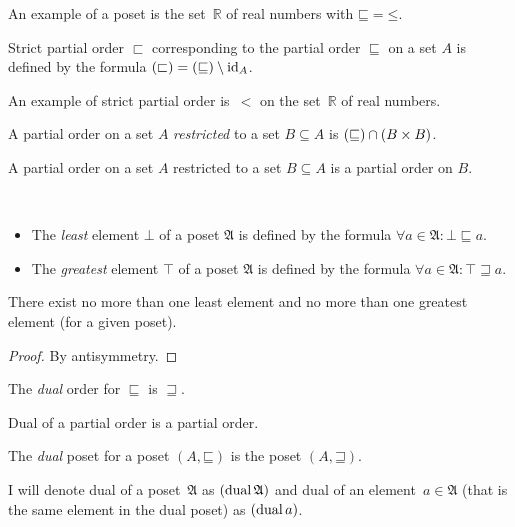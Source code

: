 An example of a poset is the set~$\mathbb{R}$ of real numbers with $\mathord{\sqsubseteq} = \mathord{\leq}$.

\begin{defn}
Strict partial order $\sqsubset$ corresponding
to the partial order $\sqsubseteq$ on a set $A$ is defined by the
formula $\left(\mathord{\sqsubset}\right)=\left(\mathord{\sqsubseteq}\right)\setminus\operatorname{id}_{A}$.
\end{defn}

An example of strict partial order is~$<$ on the set~$\mathbb{R}$ of real numbers.

\begin{defn}
A partial order on a set $A$ \emph{restricted}
to a set $B\subseteq A$ is $\left(\mathord{\sqsubseteq}\right)\cap(B\times B)$.\end{defn}
\begin{obvious}
A partial order on a set $A$ restricted to a set $B\subseteq A$
is a partial order on $B$.\end{obvious}
\begin{defn}
~
\begin{itemize}
\item {}The \emph{least} element $\bot$ of a poset
$\mathfrak{A}$ is defined by the formula $\forall a\in\mathfrak{A}:\bot\sqsubseteq a$.
\item {}The \emph{greatest} element $\top$ of a
poset $\mathfrak{A}$ is defined by the formula $\forall a\in\mathfrak{A}:\top\sqsupseteq a$.
\end{itemize}
\end{defn}
\begin{prop}
There exist no more than one least element and no more than one greatest
element (for a given poset).\end{prop}
\begin{proof}
By antisymmetry.\end{proof}
\begin{defn}
The \emph{dual} order for $\sqsubseteq$ is $\sqsupseteq$.\end{defn}
\begin{obvious}
Dual of a partial order is a partial order.\end{obvious}
\begin{defn}
The \emph{dual} poset for a poset $(A,\mathord{\sqsubseteq})$
is the poset $(A,\mathord{\sqsupseteq})$.
\end{defn}
I will denote dual of a poset~$\mathfrak{A}$ as $(\operatorname{dual}\mathfrak{A})$
and dual of an element~$a\in\mathfrak{A}$ (that is the same element
in the dual poset) as $(\operatorname{dual} a)$.

